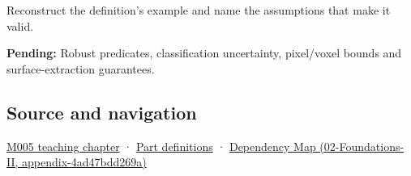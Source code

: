 Reconstruct the definition's example and name the assumptions that make it valid.

\textbf{Pending:} Robust predicates, classification uncertainty, pixel/voxel bounds and surface-extraction guarantees.

\subsection{Source and navigation}\label{source-and-navigation}

\href{Continuous\%20Notes/Computing\%20Foundations\%20-\%20From\%20Bits\%20to\%20C++\%20and\%20Systems\%20APIs\#When\%20arithmetic\%20meets\%20uncertainty}{M005 teaching chapter} · \hyperref[appendix-fd090d982a15]{Part definitions} · \href{}{Dependency Map (02-Foundations-II, appendix-4ad47bdd269a)}
